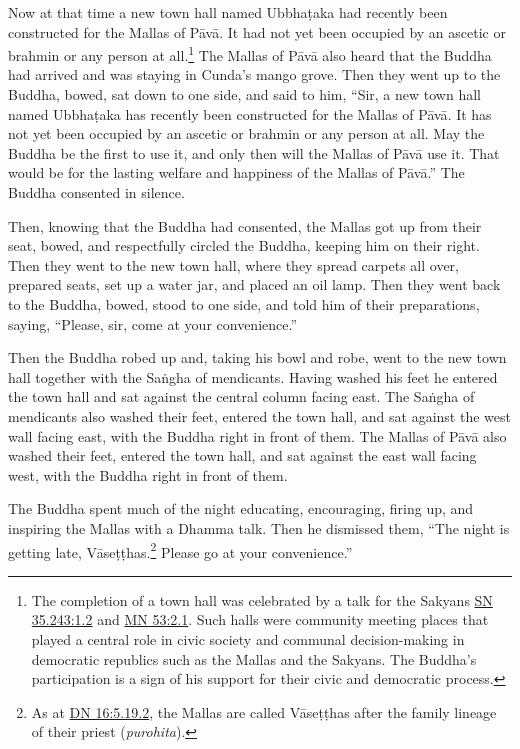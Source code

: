 \documentclass[12pt,openany]{book}%
\begin{document}
Now at that time a new town hall named \textsanskrit{Ubbhaṭaka} had recently been constructed for the Mallas of \textsanskrit{Pāvā}. It had not yet been occupied by an ascetic or brahmin or any person at all.\footnote{The completion of a town hall was celebrated by a talk for the Sakyans \href{https://suttacentral.net/sn35.243/en/sujato\#1.2}{SN 35.243:1.2} and \href{https://suttacentral.net/mn53/en/sujato\#2.1}{MN 53:2.1}. Such halls were community meeting places that played a central role in civic society and communal decision-making in democratic republics such as the Mallas and the Sakyans. The Buddha’s participation is a sign of his support for their civic and democratic process. } The Mallas of \textsanskrit{Pāvā} also heard that the Buddha had arrived and was staying in Cunda’s mango grove. Then they went up to the Buddha, bowed, sat down to one side, and said to him, “Sir, a new town hall named \textsanskrit{Ubbhaṭaka} has recently been constructed for the Mallas of \textsanskrit{Pāvā}. It has not yet been occupied by an ascetic or brahmin or any person at all. May the Buddha be the first to use it, and only then will the Mallas of \textsanskrit{Pāvā} use it. That would be for the lasting welfare and happiness of the Mallas of \textsanskrit{Pāvā}.” The Buddha consented in silence. 

Then, knowing that the Buddha had consented, the Mallas got up from their seat, bowed, and respectfully circled the Buddha, keeping him on their right. Then they went to the new town hall, where they spread carpets all over, prepared seats, set up a water jar, and placed an oil lamp. Then they went back to the Buddha, bowed, stood to one side, and told him of their preparations, saying, “Please, sir, come at your convenience.” 

Then the Buddha robed up and, taking his bowl and robe, went to the new town hall together with the \textsanskrit{Saṅgha} of mendicants. Having washed his feet he entered the town hall and sat against the central column facing east. The \textsanskrit{Saṅgha} of mendicants also washed their feet, entered the town hall, and sat against the west wall facing east, with the Buddha right in front of them. The Mallas of \textsanskrit{Pāvā} also washed their feet, entered the town hall, and sat against the east wall facing west, with the Buddha right in front of them. 

The Buddha spent much of the night educating, encouraging, firing up, and inspiring the Mallas with a Dhamma talk. Then he dismissed them, “The night is getting late, \textsanskrit{Vāseṭṭhas}.\footnote{As at \href{https://suttacentral.net/dn16/en/sujato\#5.19.2}{DN 16:5.19.2}, the Mallas are called \textsanskrit{Vāseṭṭhas} after the family lineage of their priest (\textit{purohita}). } Please go at your convenience.” 
\end{document}
